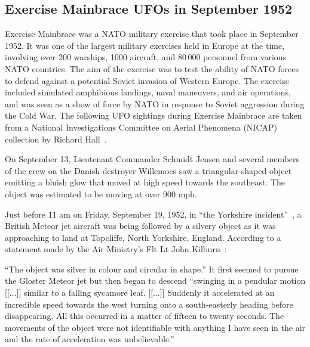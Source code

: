 \subsection{Exercise Mainbrace UFOs in September 1952}

Exercise Mainbrace was a NATO military exercise that took place in September 1952. It was one of the largest military exercises held in Europe at the time, involving over 200 warships, 1000 aircraft, and 80\,000 personnel from various NATO countries. The aim of the exercise was to test the ability of NATO forces to defend against a potential Soviet invasion of Western Europe. The exercise included simulated amphibious landings, naval maneuvers, and air operations, and was seen as a show of force by NATO in response to Soviet aggression during the Cold War.
The following UFO sightings during Exercise Mainbrace are taken from a National Investigations Committee on Aerial Phenomena  (NICAP)
collection by Richard Hall~\cite{Hall2009Oct}.

On September 13, Lieutenant Commander Schmidt Jensen and several members of the crew on the Danish destroyer Willemoes saw a triangular-shaped object emitting a bluish glow that moved at high speed towards the southeast. The object was estimated to be moving at over 900 mph.


Just before 11 am on Friday, September 19, 1952,
in ``the Yorkshire incident''~\cite{Clarke-Mainbrace-2020Dec},
a British Meteor jet aircraft was being followed by a silvery object as it was approaching to land at Topcliffe, North Yorkshire, England.
According to a statement made by the Air Ministry's Flt Lt John Kilburn~\cite{AIR16bb1199,Team2022Sep,ClarkeTopcliff2022Sep}:
\begin{svgraybox}
``The object was silver in colour and circular in shape.''
It first seemed to pursue the Gloster Meteor jet but then began to descend
``swinging in a pendular motion
[[$\ldots$]]
similar to a falling sycamore leaf.
[[$\ldots$]]
Suddenly it accelerated at an incredible speed towards the west turning onto a south-easterly heading before disappearing.
All this occurred in a matter of fifteen to twenty seconds.
The movements of the object were not identifiable with anything I have seen in the air and the rate of acceleration was unbelievable.''
\end{svgraybox}


